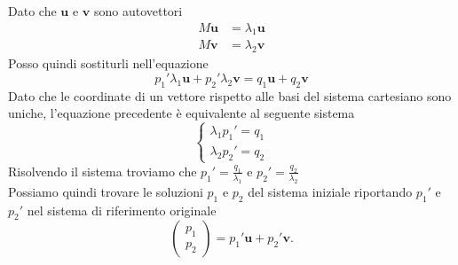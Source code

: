 \documentclass[10pt,a4paper]{article}
\theoremstyle{plain}
\theoremstyle{definition}
\begin{document}
Dato che $\mathbf{u}$ e $\mathbf{v}$ sono autovettori
\begin{align*}
M\mathbf{u}&=\lambda_1 \mathbf{u} \\
M\mathbf{v}&=\lambda_2 \mathbf{v}
\end{align*}
Posso quindi sostiturli nell'equazione
\[
p_1'\lambda_1\mathbf{u}+p_2'\lambda_2\mathbf{v}=q_1\mathbf{u}+q_2\mathbf{v}
\]
Dato che le coordinate di un vettore rispetto alle basi del sistema cartesiano sono uniche, l'equazione precedente è equivalente al seguente sistema
\[
\begin{cases*}
\lambda_1p_1'=q_1 \\
\lambda_2p_2'=q_2	
\end{cases*}
\]
Risolvendo il sistema troviamo che $p_1'=\frac{q_1}{\lambda_1}$ e $p_2'=\frac{q_2}{\lambda_2}$\\
Possiamo quindi trovare le soluzioni $p_1$ e $p_2$ del sistema iniziale riportando $p_1'$ e $p_2'$ nel sistema di riferimento originale
\[
\begin{pmatrix}
p_1 \\
p_2
\end{pmatrix}
=
p_1'\mathbf{u}+p_2'\mathbf{v}\text{.}
\]
\end{document}
